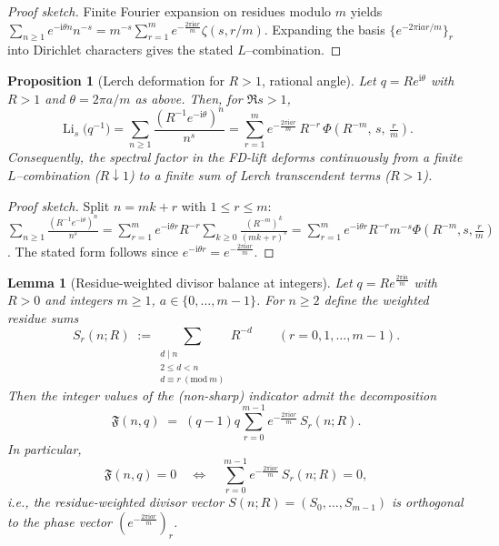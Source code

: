 \documentclass[11pt,a4paper]{amsart}
\theoremstyle{plain}
\newtheorem{lemma}[theorem]{Lemma}
\newtheorem{proposition}[theorem]{Proposition}
\theoremstyle{definition}
\theoremstyle{remark}
\begin{document}
\begin{proof}[Proof sketch]
Finite Fourier expansion on residues modulo $m$ yields\\
$\sum_{n\ge1}\! e^{-\mathrm{i}\theta n} n^{-s}=m^{-s}\sum_{r=1}^m e^{-\frac{2\pi \mathrm{i} a r}{m}} \zeta(s,r/m)$.
Expanding the basis $\{e^{-2\pi \mathrm{i} a r/m}\}_{r}$ into Dirichlet characters gives the stated $L$--combination.
\end{proof}

\begin{proposition}[Lerch deformation for $R>1$, rational angle]
\label{prop:lerch-deformation}
Let $q=R e^{\mathrm{i}\theta}$ with $R>1$ and $\theta=2\pi a/m$ as above. Then, for $\Re s>1$,
\[
\operatorname{Li}_s\!\big(q^{-1}\big)
=\sum_{n\ge1}\frac{(R^{-1}e^{-\mathrm{i}\theta})^{n}}{n^{s}}
=\sum_{r=1}^{m} e^{-\tfrac{2\pi \mathrm{i} a r}{m}}\,R^{-r}\,\Phi\!\left(R^{-m},\,s,\,\tfrac{r}{m}\right).
\]
Consequently, the spectral factor in the FD-lift deforms continuously from a finite $L$--combination
($R\downarrow 1$) to a finite sum of Lerch transcendent terms ($R>1$).
\end{proposition}

\begin{proof}[Proof sketch]
Split $n=mk+r$ with $1\le r\le m$:
$\sum_{n\ge1}\frac{(R^{-1} e^{-\mathrm{i}\theta})^{n}}{n^s}
=\sum_{r=1}^{m} e^{-\mathrm{i}\theta r} R^{-r}\sum_{k\ge0}\frac{(R^{-m})^{k}}{(mk+r)^s}
=\sum_{r=1}^{m} e^{-\mathrm{i}\theta r} R^{-r} m^{-s}\Phi\!\left(R^{-m},s,\tfrac{r}{m}\right)$.
The stated form follows since $e^{-\mathrm{i}\theta r}=e^{-\tfrac{2\pi \mathrm{i} a r}{m}}$.
\end{proof}

\begin{lemma}[Residue-weighted divisor balance at integers]
\label{lem:residue-balance}
Let $q=R e^{\tfrac{2\pi \mathrm{i} a}{m}}$ with $R>0$ and integers $m\ge1$, $a\in\{0,\dots,m-1\}$.
For $n\ge2$ define the weighted residue sums
\[
S_{r}(n;R)\;:=\!\!\sum_{\substack{d\mid n\\ 2\le d<n\\ d\equiv r\ (\mathrm{mod}\ m)}}\! R^{-d}\qquad (r=0,1,\dots,m-1).
\]
Then the integer values of the (non-sharp) indicator admit the decomposition
\[
\mathfrak F(n,q)\;=\;(q-1)q\sum_{r=0}^{m-1} e^{-\tfrac{2\pi \mathrm{i} a r}{m}}\,S_{r}(n;R).
\]
In particular,
\[
\mathfrak F(n,q)=0
\quad\Longleftrightarrow\quad
\sum_{r=0}^{m-1} e^{-\tfrac{2\pi \mathrm{i} a r}{m}}\,S_{r}(n;R)=0,
\]
i.e., the residue-weighted divisor vector $S(n;R)=(S_0,\dots,S_{m-1})$ is orthogonal to the phase vector
$(e^{-\tfrac{2\pi \mathrm{i} a r}{m}})_{r}$.
\end{lemma}
\end{document}
